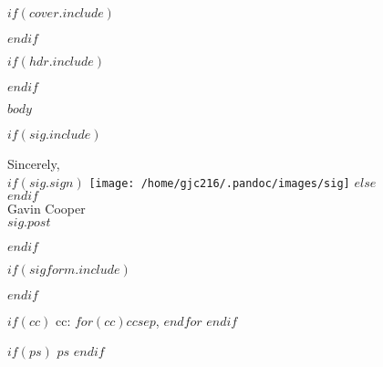\documentclass[a4paper]{article}
\newcommand{\coverpage}[0]{
	$if(cover.include)$
		
	$endif$
}
\newcommand{\header}[0]{
	$if(hdr.include)$
		
	$endif$
}
\begin{document}
\coverpage

\header

$body$

$if(sig.include)$
    \begin{minipage}[t]{6.5in}
    Sincerely,\\
    $if(sig.sign)$
        \vspace{-0.2in}\texttt{[image: /home/gjc216/.pandoc/images/sig]}
    $else$
        \\
    $endif$
    \\
    Gavin Cooper\\
    $sig.post$
    \end{minipage}
$endif$

$if(sigform.include)$
	
$endif$

$if(cc)$
    cc: $for(cc)$$cc$$sep$, $endfor$
$endif$

$if(ps)$
    $ps$
$endif$
\end{document}
